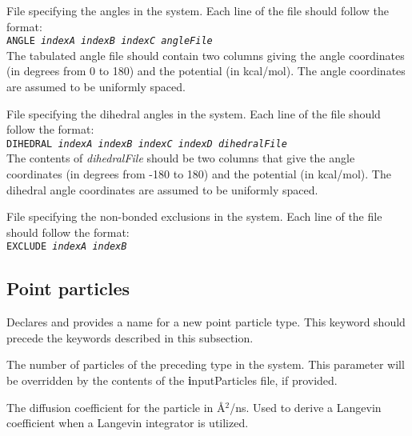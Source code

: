 \documentclass[10pt]{article}
\newcommand{\code}[1]{\texttt{#1}}
\begin{document}

{File specifying the angles in the system.
Each line of the file should follow the format: \\\noindent
\code{ANGLE \textit{indexA} \textit{indexB} \textit{indexC} \textit{angleFile}} \\ \noindent
The tabulated angle file should contain two columns giving the angle coordinates (in degrees from 0 to 180) and the potential (in kcal/mol).
The angle coordinates are assumed to be uniformly spaced. 
}

{File specifying the dihedral angles in the system.
Each line of the file should follow the format: \\\noindent
\code{DIHEDRAL \textit{indexA} \textit{indexB} \textit{indexC} \textit{indexD} \textit{dihedralFile}} \\ \noindent
The contents of \textit{dihedralFile} should be two columns that give the angle coordinates (in degrees from -180 to 180) and the potential (in kcal/mol).
The dihedral angle coordinates are assumed to be uniformly spaced.
}

{File specifying the non-bonded exclusions in the system.
Each line of the file should follow the format: \\ \noindent
\code{EXCLUDE \textit{indexA} \textit{indexB}}  \\ \noindent
}


\subsection{Point particles}

{Declares and provides a name for a new point particle type. This keyword should precede the keywords described in this subsection.}

{The number of particles of the preceding type in the system. This parameter will be overridden by the contents of the {\textbf inputParticles} file, if provided.}

{The diffusion coefficient for the particle in \AA$^2$/ns. Used to derive a Langevin coefficient when a Langevin integrator is utilized.}
\end{document}
